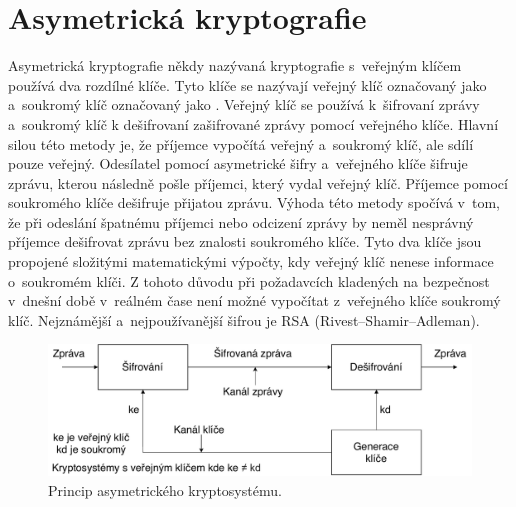 \section{Asymetrická kryptografie}
Asymetrická kryptografie někdy nazývaná kryptografie s~veřejným klíčem používá dva rozdílné klíče. Tyto klíče se nazývají veřejný klíč označovaný jako  a~soukromý klíč označovaný jako . Veřejný klíč se používá k~šifrovaní zprávy a~soukromý klíč k dešifrovaní zašifrované zprávy pomocí veřejného klíče. Hlavní silou této metody je, že příjemce vypočítá veřejný a~soukromý klíč, ale sdílí pouze veřejný. Odesílatel pomocí asymetrické šifry a~veřejného klíče šifruje zprávu, kterou následně pošle příjemci, který vydal veřejný klíč. Příjemce pomocí soukromého klíče dešifruje přijatou zprávu. Výhoda této metody spočívá v~tom, že při odeslání špatnému příjemci nebo odcizení zprávy by neměl nesprávný příjemce dešifrovat zprávu bez znalosti soukromého klíče. Tyto dva klíče jsou propojené složitými matematickými výpočty, kdy veřejný klíč nenese informace o~soukromém klíči. Z tohoto důvodu při požadavcích kladených na bezpečnost v~dnešní době v~reálném čase není možné vypočítat z~veřejného klíče soukromý klíč. Nejznámější a~nejpoužívanější šifrou je RSA
(Rivest–Shamir–Adleman).\cite{Nigel9780077099879ISBN}
\newpage
\begin{figure}[!h]
  \begin{center}
    \includegraphics[scale=0.5]{obrazky/AsymmetricCrutosystem.pdf}
  \end{center}
  \caption[Princip asymetrického kryptosystému]{Princip asymetrického kryptosystému.\footnotemark\cite{Mao0130669431ISBN}}
  \label{img:asymmetricCrypto}
\end{figure}
